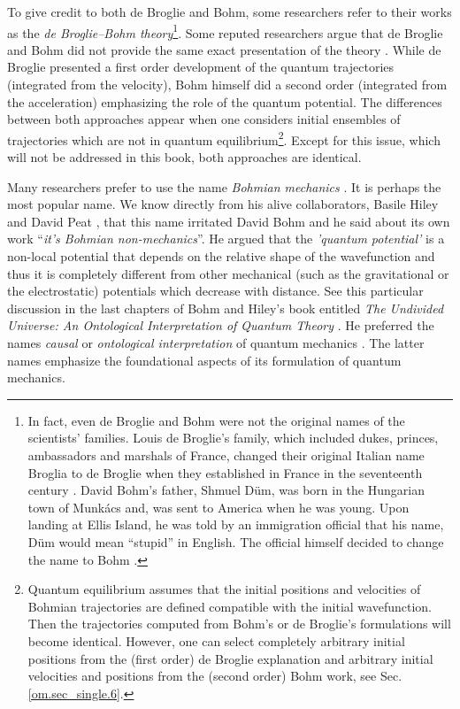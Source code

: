 \documentclass[nofootinbib, secnumarabic, amsmath, nobibnotes,10pt,aps,pra]{revtex4-1}
\newcommand{\sref}[1]{Sec. \ref{#1}}
\begin{document}
To give credit to both de Broglie and Bohm, some researchers refer to their works as the \emph{de Broglie--Bohm theory}\footnote{In fact, even de Broglie and Bohm were not the original names of the scientists' families.  Louis de Broglie's family, which included dukes, princes, ambassadors and marshals of France, changed their original Italian name Broglia to de Broglie when they established in France in the seventeenth century \cite{om.valentini2009Solvay}. David Bohm's father,  Shmuel D\"um,  was born in the Hungarian town of Munk\'acs and, was sent to America when he was young. Upon landing at Ellis Island, he was told by an immigration official that his name, D\"um would mean ``stupid'' in English. The official himself decided to change the name to Bohm \cite{om.infinite_potential}.}\cite{om.Holand1993}.
Some reputed researchers argue that de Broglie and Bohm did not provide the same exact presentation of the theory \cite{om.Valentini2006,om.valentini2008}. While de Broglie presented a first order development of the quantum trajectories (integrated from the velocity), Bohm himself did a second order (integrated from the acceleration) emphasizing the role of the quantum potential. The differences between both approaches appear when one considers initial ensembles of trajectories which are not in quantum equilibrium\footnote{Quantum equilibrium assumes that the initial positions and velocities of Bohmian trajectories are defined compatible with the initial wavefunction. Then the trajectories computed from Bohm's or de Broglie's formulations will become identical. However, one can select completely arbitrary initial positions from the (first order) de Broglie explanation and arbitrary initial velocities and positions from the (second order) Bohm work, see \sref{om.sec_single.6}.}. Except for this issue, which will not be addressed in this book, both approaches are identical.

Many researchers prefer to use the name \emph{Bohmian mechanics} \cite{om.Bohmian1996}. It is perhaps the most popular name. We know directly from his alive collaborators, Basile Hiley and David Peat \cite{om.davidpeat}, that this name irritated David Bohm and he said about its own work ``\textit{it's Bohmian non-mechanics}''. He argued that the {\emph{'quantum potential'}} is a non-local potential that depends on the relative shape of the wavefunction and thus it is completely different from other mechanical (such as the gravitational or the electrostatic) potentials which decrease with distance. See this particular discussion in the last chapters of Bohm and Hiley's book entitled \emph{The Undivided Universe: An Ontological Interpretation of Quantum Theory} \cite{om.Bohm1993}. He preferred the names \emph{causal} or \emph{ontological interpretation} of quantum mechanics \cite{om.Holand1993,om.Bohm1993}. The latter names emphasize the foundational aspects of its formulation of quantum mechanics.
\end{document}
